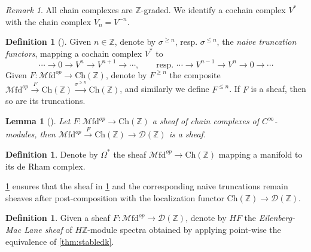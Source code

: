 \documentclass[10pt]{amsart}
\newcommand{\D}{\mathscr{D}}
\newcommand{\bZ}{\mathbb{Z}}
\newcommand{\Ch}{\mathrm{Ch}}
\newcommand{\Mfd}{\mathscr{M}\mathrm{fd}}
\newtheorem{lemma}[equation]{Lemma}
\theoremstyle{definition}
\newtheorem{definition}[equation]{Definition}
\theoremstyle{remark}
\newtheorem{remark}[equation]{Remark}
\numberwithin{equation}{section}
\begin{document}
\begin{remark}\label{rmk:identification}
  All chain complexes are $\bZ$-graded. We identify a cochain complex $V^*$ with the chain complex $V_n=V^{-n}$. 
\end{remark}
\begin{definition}[{\cite[Definition 7.14]{bunkenikolausvoelkl2016diffcoh}}]Given $n\in\bZ$, denote by $\sigma^{\geq n}$, resp. $\sigma^{\leq n}$, the \emph{naive truncation functors}, mapping a cochain complex $V^*$ to \[\cdots\to0\to V^n\to V^{n+1}\to\cdots, \qquad \mbox{resp. }\cdots\to V^{n-1}\to V^n\to0\to\cdots\]Given $F:\Mfd^{op}\to\Ch(\bZ)$, denote by $F^{\geq n}$ the composite $\Mfd^{op}\xrightarrow{F}\Ch(\bZ)\xrightarrow{\sigma^{\geq n}}\Ch(\bZ)$, and similarly we define $F^{\leq n}$. If $F$ is a sheaf, then so are its truncations. 
\end{definition}
\begin{lemma}[{\cite[Lemma 7.12]{bunkenikolausvoelkl2016diffcoh}}]\label{lem:sheafloc}
  Let $F:\Mfd^{op}\to\Ch(\bZ)$ a sheaf of chain complexes of $C^\infty$-modules, then $\Mfd^{op}\xrightarrow{F}\Ch(\bZ)\to\D(\bZ)$ is a sheaf. 
\end{lemma}
\begin{definition}\label{def:forms}
  Denote by $\Omega^*$ the sheaf $\Mfd^{op}\to\Ch(\bZ)$ mapping a manifold to its de Rham complex. 
\end{definition}
\cref{lem:sheafloc} ensures that the sheaf in \cref{def:forms} and the corresponding naive truncations remain sheaves after post-composition with the localization functor $\Ch(\bZ)\to\D(\bZ)$.  
\begin{definition}\label{def:EMsheaf}
  Given a sheaf $F:\Mfd^{op}\to\D(\bZ)$, denote by $HF$ the \emph{Eilenberg-Mac Lane sheaf} of $H\bZ$-module spectra obtained by applying point-wise the equivalence of \cref{thm:stabledk}. 
\end{definition}
\end{document}
